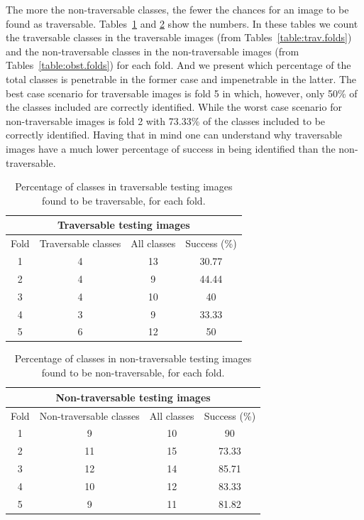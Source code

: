 \documentclass[12pt,a4paper,table,dvipsnames,tikz]{report}
\newcommand{\bl}[1]{{\hypersetup{linkcolor=blue}#1}}
\begin{document}
	The more the non-traversable classes, the fewer the chances for an image to be found as 
	traversable. Tables~\bl{\ref{table:trav.classes}} and \bl{\ref{table:obst.classes}} show 
	the numbers. In these tables we count the traversable classes in the traversable images 
	(from Tables~\bl{\ref{table:trav.folds}}) and the non-traversable classes in the 
	non-traversable images (from Tables~\bl{\ref{table:obst.folds}}) for each fold. And we 
	present which percentage of the total classes is penetrable in the former case and 
	impenetrable in the latter. The best case scenario for traversable images is fold 5 in 
	which, however, only 50\% of the classes included are correctly identified. While the 
	worst case scenario for non-traversable images is fold 2 with 73.33\% of the classes 
	included to be correctly identified. Having that in mind 
	one can understand why traversable images have a much lower percentage of success in 
	being identified than the non-traversable.
	\\
	
	
	\begin{table}[h!]
		\caption{Percentage of classes in traversable testing images found to be traversable, 
			for each fold.}
		\centering
		\begin{tabular}{|c|c|c|c|}
			\hline
			\multicolumn{4}{|c|}{Traversable testing images}\\
			\hline
			Fold & Traversable classes & All classes & Success (\%)\\
			\hline
			1 & 4 & 13 & 30.77\\
			\hline
			2 & 4 & 9 & 44.44\\
			\hline
			3 & 4 & 10 & 40\\
			\hline
			4 & 3 & 9 & 33.33\\
			\hline
			5 & 6 & 12 & 50\\
			\hline
		\end{tabular}
		\label{table:trav.classes}
	\end{table}
	
	\begin{table}[h!]
		\caption{Percentage of classes in non-traversable testing images found to be 
			non-traversable, for each fold.}
		\centering
		\begin{tabular}{|c|c|c|c|}
			\hline
			\multicolumn{4}{|c|}{Non-traversable testing images}\\
			\hline
			Fold & Non-traversable classes & All classes & Success (\%)\\
			\hline
			1 & 9 & 10 & 90\\
			\hline
			2 & 11 & 15 & 73.33\\
			\hline
			3 & 12 & 14 & 85.71\\
			\hline
			4 & 10 & 12 & 83.33\\
			\hline
			5 & 9 & 11 & 81.82\\
			\hline
		\end{tabular}
		\label{table:obst.classes}
	\end{table}
	
\end{document}
